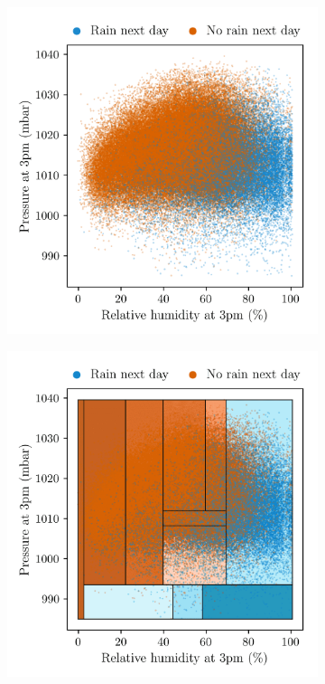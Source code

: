 \begin{figure}[ht]
  \centering
  \begin{subfigure}{0.49\textwidth}
    \centering
    \includegraphics[scale=0.64]{graphics/weather_data.png}%
  \end{subfigure}
  \begin{subfigure}{0.49\textwidth}
    \centering
    \includegraphics[scale=0.64]{graphics/weather_data_filled_partition.png}%

\end{subfigure}
\end{figure}

